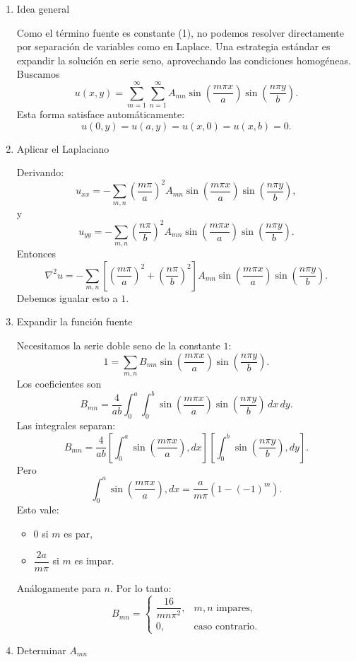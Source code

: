 \documentclass[11pt,spanish]{article}
\begin{document}
\begin{enumerate}
\item Idea general

Como el término fuente es constante (1), no podemos resolver directamente por separación de variables como en Laplace. Una estrategia estándar es expandir la solución en serie seno, aprovechando las condiciones homogéneas.
Buscamos
$$
u(x,y)=
\sum_{m=1}^\infty
\sum_{n=1}^\infty
A_{mn}
\sin\left(\frac{m\pi x}{a}\right)
\sin\left(\frac{n\pi y}{b}\right).
$$
Esta forma satisface automáticamente:
$$
u(0,y)=u(a,y)=u(x,0)=u(x,b)=0.
$$

\item Aplicar el Laplaciano

Derivando:
$$
u_{xx}
=
-\sum_{m,n}
\left(\frac{m\pi}{a}\right)^2
A_{mn}
\sin\left(\frac{m\pi x}{a}\right)
\sin\left(\frac{n\pi y}{b}\right),
$$
y
$$
u_{yy}
=
-\sum_{m,n}
\left(\frac{n\pi}{b}\right)^2
A_{mn}
\sin\left(\frac{m\pi x}{a}\right)
\sin\left(\frac{n\pi y}{b}\right).
$$
Entonces
$$
\nabla^2 u
=
-\sum_{m,n}
\left[
\left(\frac{m\pi}{a}\right)^2
+
\left(\frac{n\pi}{b}\right)^2
\right]
A_{mn}
\sin\left(\frac{m\pi x}{a}\right)
\sin\left(\frac{n\pi y}{b}\right).
$$
Debemos igualar esto a $1$.

\item Expandir la función fuente

Necesitamos la serie doble seno de la constante $1$:
$$
1=
\sum_{m,n}
B_{mn}
\sin\left(\frac{m\pi x}{a}\right)
\sin\left(\frac{n\pi y}{b}\right).
$$
Los coeficientes son
$$
B_{mn}
=
\frac{4}{ab}
\int_0^a\int_0^b
\sin\left(\frac{m\pi x}{a}\right)
\sin\left(\frac{n\pi y}{b}\right)
\,dx\,dy.
$$
Las integrales separan:
$$
B_{mn}
=
\frac{4}{ab}
\left[
\int_0^a
\sin\left(\frac{m\pi x}{a}\right),dx
\right]
\left[
\int_0^b
\sin\left(\frac{n\pi y}{b}\right),dy
\right].
$$
Pero
$$
\int_0^a
\sin\left(\frac{m\pi x}{a}\right),dx
=
\frac{a}{m\pi}\left(1-(-1)^m\right).
$$
Esto vale:
\begin{itemize}
\item $0$ si $m$ es par,
\item $\dfrac{2a}{m\pi}$ si $m$ es impar.
\end{itemize}
Análogamente para $n$.
Por lo tanto:
$$
B_{mn}=
\begin{cases}
\dfrac{16}{mn\pi^2}, & m,n \text{ impares},\\
0, & \text{caso contrario}.
\end{cases}
$$

\item Determinar $A_{mn}$


\end{enumerate}
\end{document}
